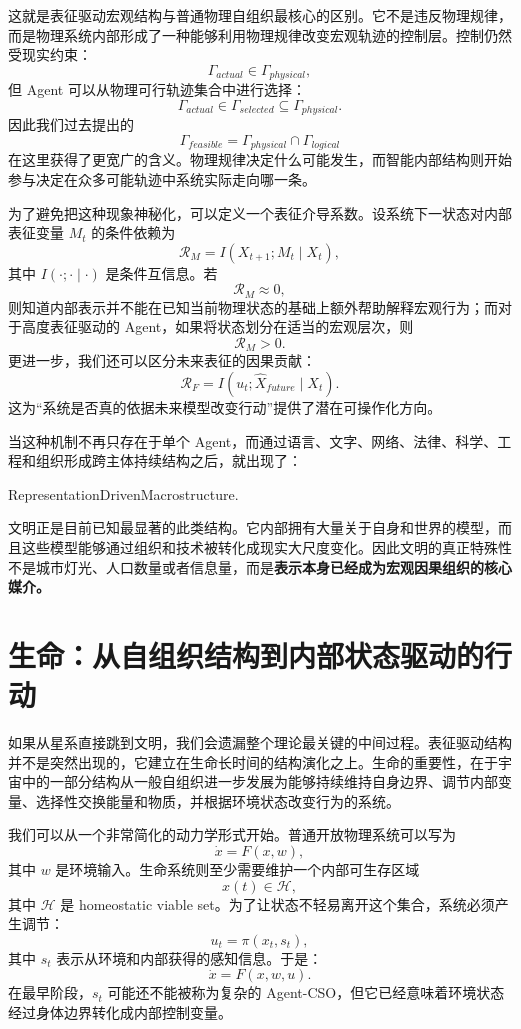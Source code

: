 这就是表征驱动宏观结构与普通物理自组织最核心的区别。它不是违反物理规律，而是物理系统内部形成了一种能够利用物理规律改变宏观轨迹的控制层。控制仍然受现实约束：
\[
\Gamma_{actual}
\in
\Gamma_{physical},
\]
但 Agent 可以从物理可行轨迹集合中进行选择：
\[
\Gamma_{actual}
\in
\Gamma_{selected}
\subseteq
\Gamma_{physical}.
\]
因此我们过去提出的
\[
\Gamma_{feasible}
=
\Gamma_{physical}
\cap
\Gamma_{logical}
\]
在这里获得了更宽广的含义。物理规律决定什么可能发生，而智能内部结构则开始参与决定在众多可能轨迹中系统实际走向哪一条。

为了避免把这种现象神秘化，可以定义一个表征介导系数。设系统下一状态对内部表征变量 $M_t$ 的条件依赖为
\[
\mathcal{R}_{M}
=
I
\left(
X_{t+1};M_t
\mid
X_t
\right),
\]
其中 $I(\cdot;\cdot\mid\cdot)$ 是条件互信息。若
\[
\mathcal{R}_{M}\approx 0,
\]
则知道内部表示并不能在已知当前物理状态的基础上额外帮助解释宏观行为；而对于高度表征驱动的 Agent，如果将状态划分在适当的宏观层次，则
\[
\mathcal{R}_{M}>0.
\]
更进一步，我们还可以区分未来表征的因果贡献：
\[
\mathcal{R}_{F}
=
I
\left(
u_t;
\widehat{X}_{future}
\mid
X_t
\right).
\]
这为“系统是否真的依据未来模型改变行动”提供了潜在可操作化方向。

当这种机制不再只存在于单个 Agent，而通过语言、文字、网络、法律、科学、工程和组织形成跨主体持续结构之后，就出现了：
\begin{statementbox}
RepresentationDrivenMacrostructure.
\end{statementbox}
文明正是目前已知最显著的此类结构。它内部拥有大量关于自身和世界的模型，而且这些模型能够通过组织和技术被转化成现实大尺度变化。因此文明的真正特殊性不是城市灯光、人口数量或者信息量，而是\textbf{表示本身已经成为宏观因果组织的核心媒介。}

\section{生命：从自组织结构到内部状态驱动的行动}

如果从星系直接跳到文明，我们会遗漏整个理论最关键的中间过程。表征驱动结构并不是突然出现的，它建立在生命长时间的结构演化之上。生命的重要性，在于宇宙中的一部分结构从一般自组织进一步发展为能够持续维持自身边界、调节内部变量、选择性交换能量和物质，并根据环境状态改变行为的系统。

我们可以从一个非常简化的动力学形式开始。普通开放物理系统可以写为
\[
\dot{x}=F(x,w),
\]
其中 $w$ 是环境输入。生命系统则至少需要维护一个内部可生存区域
\[
x(t)\in\mathcal{H},
\]
其中 $\mathcal{H}$ 是 homeostatic viable set。为了让状态不轻易离开这个集合，系统必须产生调节：
\[
u_t
=
\pi
\left(
x_t,
s_t
\right),
\]
其中 $s_t$ 表示从环境和内部获得的感知信息。于是：
\[
\dot{x}
=
F(x,w,u).
\]
在最早阶段，$s_t$ 可能还不能被称为复杂的 Agent-CSO，但它已经意味着环境状态经过身体边界转化成内部控制变量。

